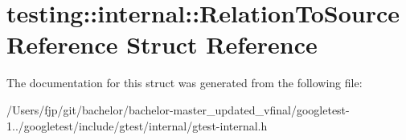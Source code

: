 \hypertarget{structtesting_1_1internal_1_1_relation_to_source_reference}{}\section{testing\+:\+:internal\+:\+:Relation\+To\+Source\+Reference Struct Reference}
\label{structtesting_1_1internal_1_1_relation_to_source_reference}


The documentation for this struct was generated from the following file\+:\begin{DoxyCompactItemize}
\item 
/\+Users/fjp/git/bachelor/bachelor-\/master\+\_\+updated\+\_\+vfinal/googletest-\/1../googletest/include/gtest/internal/gtest-\/internal.\+h\end{DoxyCompactItemize}
